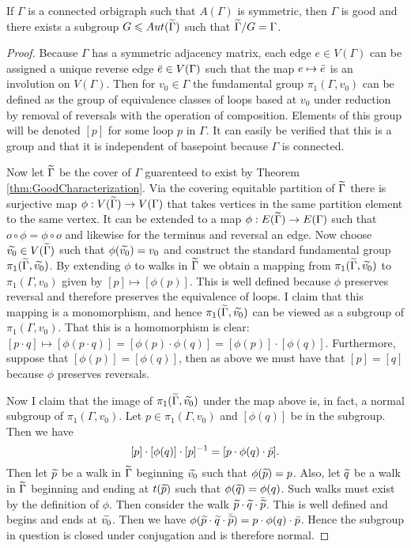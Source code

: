 \begin{theorem}
  If $\Gamma$ is a connected orbigraph such that $A(\Gamma)$ is symmetric, then $\Gamma$ is good and there exists a subgroup $G \leqslant Aut(\widetilde{\Gamma})$ such that $\widetilde{\Gamma} / G = \Gamma$.
\end{theorem}
\begin{proof}
  Because $\Gamma$ has a symmetric adjacency matrix, each edge $e \in V(\Gamma)$ can be assigned a unique reverse edge $\bar{e} \in V(\Gamma)$ such that the map $e \mapsto \bar{e}$ is an involution on $V(\Gamma)$. Then for $v_0 \in \Gamma$ the fundamental group $\pi_1(\Gamma, v_0)$ can be defined as the group of equivalence classes of loops based at $v_0$ under reduction by removal of reversals with the operation of composition. Elements of this group will be denoted $[p]$ for some loop $p$ in $\Gamma$. It can easily be verified that this is a group and that it is independent of basepoint because $\Gamma$ is connected.

  Now let $\widetilde{\Gamma}$ be the cover of $\Gamma$ guarenteed to exist by Theorem \ref{thm:GoodCharacterization}. Via the covering equitable partition of $\widetilde{\Gamma}$ there is surjective map $\phi : V(\widetilde{\Gamma}) \to V(\Gamma)$ that takes vertices in the same partition element to the same vertex. It can be extended to a map $\phi: E(\widetilde{\Gamma}) \to E(\Gamma)$ such that $o \circ \phi = \phi \circ o$ and likewise for the terminus and reversal an edge. Now choose $\widetilde{v_0} \in V(\widetilde{\Gamma})$ such that $\phi(\widetilde{v_0}) = v_0$ and construct the standard fundamental group $\pi_1(\widetilde{\Gamma}, \widetilde{v_0})$. By extending $\phi$ to walks in $\widetilde{\Gamma}$ we obtain a mapping from $\pi_1(\widetilde{\Gamma}, \widetilde{v_0})$ to $\pi_1(\Gamma, v_0)$ given by $[p] \mapsto [\phi(p)]$. This is well defined because $\phi$ preserves reversal and therefore preserves the equivalence of loops. I claim that this mapping is a monomorphism, and hence $\pi_1(\widetilde{\Gamma}, \widetilde{v_0})$ can be viewed as a subgroup of $\pi_1(\Gamma, v_0)$. That this is a homomorphism is clear: $[p \cdot q] \mapsto [\phi(p \cdot q)] = [\phi(p) \cdot \phi(q)] = [\phi(p)] \cdot [\phi(q)]$. Furthermore, suppose that $[\phi(p)] = [\phi(q)]$, then as above we must have that $[p] = [q]$ because $\phi$ preserves reversals. 

  Now I claim that the image of $\pi_1(\widetilde{\Gamma}, \widetilde{v_0})$ under the map above is, in fact, a normal subgroup of $\pi_1(\Gamma, v_0)$. Let $p \in \pi_1(\Gamma, v_0)$ and $[\phi(q)]$ be in the subgroup. Then we have
  $$
    [p] \cdot [\phi(q)] \cdot [p]^{-1} = [p \cdot \phi(q) \cdot \bar{p}].
  $$
  Then let $\widetilde{p}$ be a walk in $\widetilde{\Gamma}$ beginning $\widetilde{v_0}$ such that $\phi(\widetilde{p}) = p$. Also, let $\widetilde{q}$ be a walk in $\widetilde{\Gamma}$ beginning and ending at $t(\widetilde{p})$ such that $\phi(\widetilde{q}) = \phi(q)$. Such walks must exist by the definition of $\phi$. Then consider the walk $\widetilde{p} \cdot \widetilde{q} \cdot \bar{\widetilde{p}}$. This is well defined and begins and ends at $\widetilde{v_0}$. Then we have $\phi(\widetilde{p} \cdot \widetilde{q} \cdot \bar{\widetilde{p}}) = p \cdot \phi(q) \cdot \bar{p}$. Hence the subgroup in question is closed under conjugation and is therefore normal. 


\end{proof}

